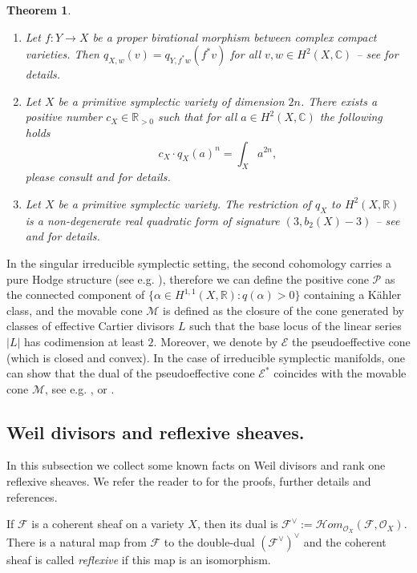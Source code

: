 \documentclass[12pt,reqno]{amsart}
\newtheorem{thm}{Theorem}[section]
\theoremstyle{plain}
\theoremstyle{definition}
\begin{document}
\begin{thm}\label{thm:useful}
\begin{enumerate} 
\item Let $f:Y\to X$ be a proper birational morphism between complex compact
varieties. Then $q_{X,w}(v)=q_{Y,f^*w}(f^*v)$ for all $v,w \in H^2(X,\mathbb C)$ -- see {\cite[Proof of Lemma 23]{Sch}} for details.

\item Let $X$ be a primitive symplectic variety of dimension $2n$. There exists a positive number $c_X\in \mathbb R_{>0}$ such that  for all $a\in H^2(X,\mathbb C)$ the following holds
$$ 
c_X\cdot q_X(a)^n=\int_Xa^{2n},
$$
please consult \cite[Theorem 2, item (1)]{Sch} and \cite[Proposition 5.15]{BL2} for details.
\item Let $X$ be a primitive symplectic variety. The restriction of $q_X$ to $H^2(X,\mathbb R)$ is a non-degenerate real quadratic form of signature $(3,b_2(X)-3)$ -- see \cite[Theorem 2 (2)]{Sch} and \cite[Lemma 5.3]{BL2} for details.
\end{enumerate}
\end{thm}

In the singular irreducible symplectic setting, the second cohomology carries a pure Hodge structure (see e.g. \cite[Corollary 3.5]{BL2}), therefore we can  define the positive cone  $\mathcal{P}$ as the connected component of $\{\alpha \in H^{1,1}(X,\mathbb{R}) : q(\alpha) > 0 \}$ containing a K\"ahler class,  and the movable cone $\mathcal{M}$ is defined as the closure of the cone generated by classes of
effective Cartier divisors $L$ such that the base locus of the linear series $|L|$ has codimension at least $2$. Moreover, we denote by $\mathcal{E}$ the pseudoeffective cone (which is closed and convex). In the case of irreducible symplectic manifolds, one can show that the dual of the pseudoeffective cone $\mathcal{E}^{*}$ coincides with the movable cone $\mathcal{M}$, see e.g. \cite[Theorem 7 and Remark 9]{HT}, \cite[Proposition 5.6]{mark_tor} or \cite[Lemma 2.7]{Den}. 

\subsection{Weil divisors and reflexive sheaves.}\label{ss:refl}
In this subsection we collect some known facts on Weil divisors and rank one reflexive sheaves. 
We refer the reader to \cite{Schwede} for the proofs, further details and references. 

If $\mathcal F$ is a coherent sheaf on a variety $X$, then its dual is $\mathcal F^\vee:={\mathcal Hom}_{\mathcal O_X}(\mathcal F, \mathcal O_X)$. There is a natural map from $\mathcal F$ to the double-dual $(\mathcal F^\vee)^\vee$ and the coherent sheaf is called {\it reflexive} if this map is an isomorphism. 
\end{document}

